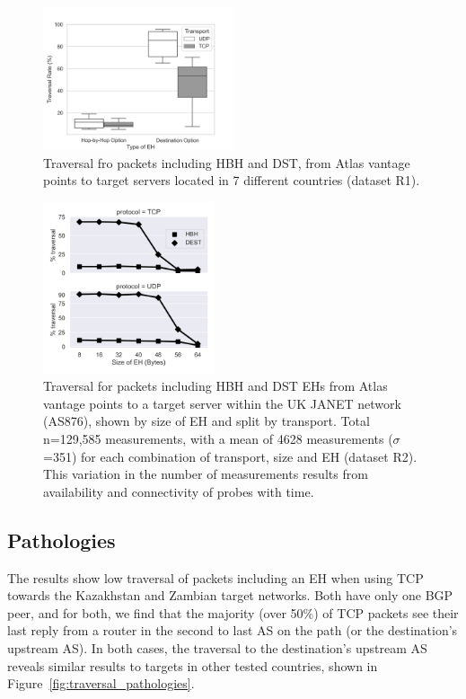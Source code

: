 \documentclass[conference]{IEEEtran}
\begin{document}
\begin{figure}
\centering
  \includegraphics[width=0.5\textwidth]{all_traversal.png}
  \caption{Traversal fro packets including HBH and DST, from Atlas vantage points to target servers located in 7 different countries (dataset R1).}
  \label{fig:countrybox}
\end{figure}

\begin{figure}
\centering
  \includegraphics[width=0.45\textwidth]{sizes.png}
  \caption{Traversal for packets including HBH and DST EHs from Atlas vantage points to a target server within the UK JANET network (AS876), shown by size of EH and split by transport.  Total n=129,585 measurements, with a mean of 4628 measurements ($\sigma$=351) for each combination of transport, size and EH  (dataset R2). This variation in the number of measurements results from availability and connectivity of  probes with time.}
  \label{fig:sizes}
\end{figure}

\subsection{Pathologies}
    \label{subsec: pathologies}

The results show low traversal of packets including an EH when using TCP towards the Kazakhstan and Zambian target networks. Both have only one BGP peer, and for both, we find that the majority (over 50\%) of TCP packets see their last reply from a router in the second to last AS on the path (or the destination's upstream AS). In both cases, the traversal to the destination's upstream AS reveals similar results to targets in other tested countries, shown in Figure~\ref{fig:traversal_pathologies}.
\end{document}
